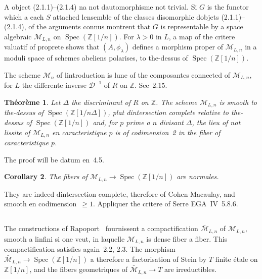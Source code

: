 \documentclass[11pt,a4paper]{article}
\theoremstyle{plain}
\newtheorem{theorem}{Th\'eor\`eme}
\newtheorem{corollary}[theorem]{Corollary}
\theoremstyle{definition}
\DeclareMathOperator{\Spec}{Spec}
\begin{document}
A object (2.1.1)--(2.1.4) na not dautomorphisme not trivial. Si $G$ is the
functor which a each $S$ attached lensemble of the classes disomorphie dobjets
(2.1.1)--(2.1.4), of the arguments connus montrent that $G$ is representable by a
space algebraic $\mathscr{M}_{L,n}$ on $\Spec(\mathbb{Z}[1/n])$. For $\lambda > 0$ in $L$, a map of the
critere valuatif of proprete shows that $(A, \phi_\lambda)$ defines a morphism proper of
$\mathscr{M}_{L,n}$ in a moduli space of schemes abeliens polarises, to the-dessus of
$\Spec(\mathbb{Z}[1/n])$.

The scheme $\mathscr{M}_n$ of lintroduction is lune of the composantes connected of $\mathscr{M}_{L,n}$,
for $L$ the differente inverse $\mathscr{D}^{-1}$ of $R$ on $\mathbb{Z}$. See~2.15.

\begin{theorem}
Let $\Delta$ the discriminant of $R$ on $\mathbb{Z}$. The scheme $\mathscr{M}_{L,n}$ is smooth
to the-dessus of $\Spec(\mathbb{Z}[1/n\Delta])$, plat dintersection complete relative to the-dessus of
$\Spec(\mathbb{Z}[1/n])$ and, for $p$ prime a $n$ divisant $\Delta$, the lieu of not lissite of $\mathscr{M}_{L,n}$ en
caracteristique $p$ is of codimension~2 in the fiber of caracteristique $p$.
\end{theorem}

The proof will be datum en~4.5.

\begin{corollary}
The fibers of $\mathscr{M}_{L,n} \to \Spec(\mathbb{Z}[1/n])$ are normales.
\end{corollary}

They are indeed dintersection complete, therefore of Cohen-Macaulay, and smooth
en codimension~$\geq 1$. Appliquer the critere of Serre EGA~IV~5.8.6.

\subsection{}

The constructions of Rapoport~\cite{Rapoport} fournissent a compactification $\bar{\mathscr{M}}_{L,n}$
of $\mathscr{M}_{L,n}$, smooth a linfini si one veut, in laquelle $\mathscr{M}_{L,n}$ is dense fiber a fiber. This
compactification satisfies again~2.2, 2.3. The morphism $\bar{\mathscr{M}}_{L,n} \to \Spec(\mathbb{Z}[1/n])$ a
therefore a factorisation of Stein by $T$ finite étale on $\mathbb{Z}[1/n]$, and the fibers
geometriques of $\bar{\mathscr{M}}_{L,n} \to T$ are irreductibles.

\subsection{}
\end{document}
